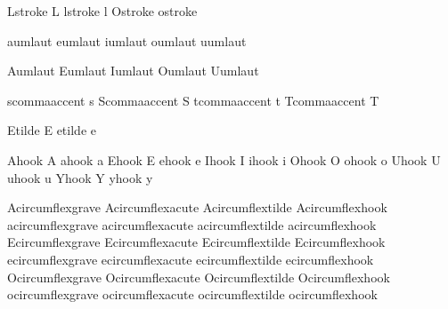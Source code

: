  Lstroke          {L}
 lstroke          {l}
 Ostroke          { } %
 ostroke          { } %

 aumlaut          {\moveaccent{-.1ex}\adiaeresis}
 eumlaut          {\moveaccent{-.1ex}\ediaeresis}
 iumlaut          {\moveaccent{-.1ex}\idiaeresis}
 oumlaut          {\moveaccent{-.1ex}\odiaeresis}
 uumlaut          {\moveaccent{-.1ex}\udiaeresis}

 Aumlaut          {\smashaccent\Adiaeresis}
 Eumlaut          {\smashaccent\Ediaeresis}
 Iumlaut          {\smashaccent\Idiaeresis}
 Oumlaut          {\smashaccent\Odiaeresis}
 Uumlaut          {\smashaccent\Udiaeresis}

 scommaaccent     {\buildtextbottomcomma s}
 Scommaaccent     {\buildtextbottomcomma S}
 tcommaaccent     {\buildtextbottomcomma t}
 Tcommaaccent     {\buildtextbottomcomma T}

 Etilde           {\buildtextaccent\texttilde E}
 etilde           {\buildtextaccent\texttilde e}

 Ahook               {A}
 ahook               {a}
 Ehook               {E}
 ehook               {e}
 Ihook               {I}
 ihook               {i}
 Ohook               {O}
 ohook               {o}
 Uhook               {U}
 uhook               {u}
 Yhook               {Y}
 yhook               {y}

 Acircumflexgrave    {\Acircumflex}
 Acircumflexacute    {\Acircumflex}
 Acircumflextilde    {\Acircumflex}
 Acircumflexhook     {\Acircumflex}
 acircumflexgrave    {\acircumflex}
 acircumflexacute    {\acircumflex}
 acircumflextilde    {\acircumflex}
 acircumflexhook     {\acircumflex}
 Ecircumflexgrave    {\Ecircumflex}
 Ecircumflexacute    {\Ecircumflex}
 Ecircumflextilde    {\Ecircumflex}
 Ecircumflexhook     {\Ecircumflex}
 ecircumflexgrave    {\ecircumflex}
 ecircumflexacute    {\ecircumflex}
 ecircumflextilde    {\ecircumflex}
 ecircumflexhook     {\ecircumflex}
 Ocircumflexgrave    {\Ocircumflex}
 Ocircumflexacute    {\Ocircumflex}
 Ocircumflextilde    {\Ocircumflex}
 Ocircumflexhook     {\Ocircumflex}
 ocircumflexgrave    {\ocircumflex}
 ocircumflexacute    {\ocircumflex}
 ocircumflextilde    {\ocircumflex}
 ocircumflexhook     {\ocircumflex}

